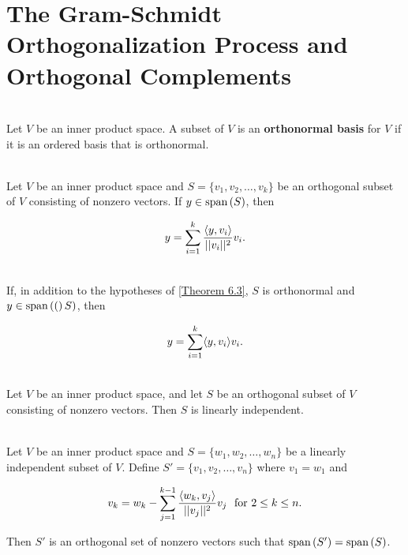 \section{The Gram-Schmidt Orthogonalization Process and Orthogonal Complements}

\begin{definition}
	\hfill\\
	Let $V$ be an inner product space. A subset of $V$ is an \textbf{orthonormal basis} for $V$ if it is an ordered basis that is orthonormal.
\end{definition}

\begin{theorem}\label{Theorem 6.3}
	\hfill\\
	Let $V$ be an inner product space and $S=\{v_1, v_2, \dots, v_k\}$ be an orthogonal subset of $V$ consisting of nonzero vectors. If $y \in \text{span}\left(S\right)$, then

	\[y = \sum_{i=1}^{k}\frac{\langle y,v_i\rangle}{||v_i||^2}v_i.\]
\end{theorem}

\begin{corollary}
	\hfill\\
	If, in addition to the hypotheses of \autoref{Theorem 6.3}, $S$ is orthonormal and $y \in \text{span}\left((\right)S)$, then

	\[y = \sum_{i=1}^{k}\langle y,v_i\rangle v_i.\]
\end{corollary}

\begin{corollary}
	\hfill\\
	Let $V$ be an inner product space, and let $S$ be an orthogonal subset of $V$ consisting of nonzero vectors. Then $S$ is linearly independent.
\end{corollary}

\begin{theorem}
	\hfill\\
	Let $V$ be an inner product space and $S = \{w_1, w_2, \dots, w_n\}$ be a linearly independent subset of $V$. Define $S' = \{v_1, v_2, \dots, v_n\}$ where $v_1 = w_1$ and

	\[v_k = w_k - \sum_{j=1}^{k-1}\frac{\langle w_k,v_j\rangle}{||v_j||^2}v_j\ \ \text{for}\ 2 \leq k \leq n.\]

	Then $S'$ is an orthogonal set of nonzero vectors such that $\text{span}\left(S'\right) = \text{span}\left(S\right)$.
\end{theorem}


